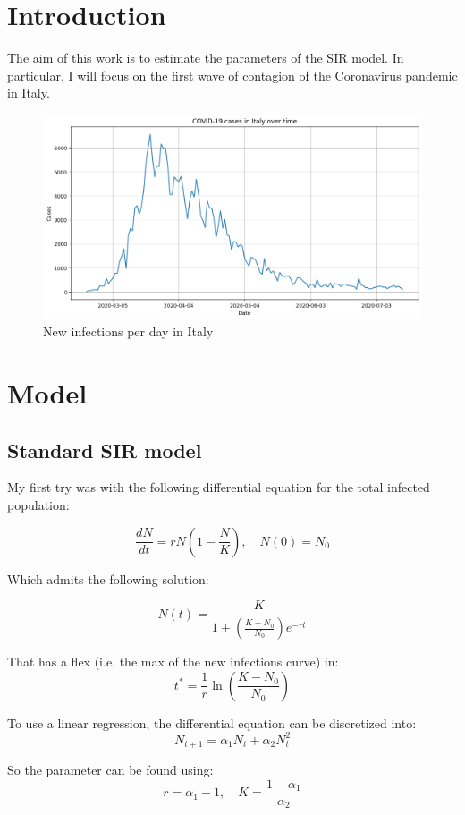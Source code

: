 \documentclass[12pt]{article}
\begin{document}
    \section{Introduction}
    The aim of this work is to estimate the parameters of the SIR model.
    In particular, I will focus on the first wave of contagion of the Coronavirus pandemic in Italy.

    \begin{figure}[h!]
        \label{fig:covid_italy}
        \centering
        \includegraphics[width=.8\linewidth]{plots/real_data}
        \caption{New infections per day in Italy}
    \end{figure}

    \section{Model}

    \subsection{Standard SIR model}
    My first try was with the following differential equation for the total infected population:

    $$\frac{dN}{dt} = r N \left(1-\frac{N}{K}\right), \quad N(0)=N_0$$

    Which admits the following solution:

    $$N(t) = \frac{K}{1+ \left(\frac{K-N_0}{N_0}\right) e^{-rt}}$$

    That has a flex (i.e. the max of the new infections curve) in:
    $$ t^* = \frac{1}{r}\ln \left(\frac{K-N_0}{N_0}\right)$$

    To use a linear regression, the differential equation can be discretized into:
    $$ N_{t+1} = \alpha_1 N_t + \alpha_2 N_{t}^2$$

    So the parameter can be found using:
    $$ r = \alpha_1-1, \quad K= \frac{1-\alpha_1}{\alpha_2}$$
\end{document}
